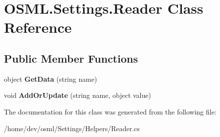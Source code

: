 \hypertarget{classOSML_1_1Settings_1_1Reader}{}\section{O\+S\+M\+L.\+Settings.\+Reader Class Reference}
\label{classOSML_1_1Settings_1_1Reader}
\subsection*{Public Member Functions}
\begin{DoxyCompactItemize}
\item 
\mbox{\label{classOSML_1_1Settings_1_1Reader_ab39a2c3237028db0bb83cbd7bf935be4}} 
object {\bfseries Get\+Data} (string name)
\item 
\mbox{\label{classOSML_1_1Settings_1_1Reader_ad57213a79275249c4053860ea181af94}} 
void {\bfseries Add\+Or\+Update} (string name, object value)
\end{DoxyCompactItemize}


The documentation for this class was generated from the following file\+:\begin{DoxyCompactItemize}
\item 
/home/dev/osml/\+Settings/\+Helpers/Reader.\+cs\end{DoxyCompactItemize}
